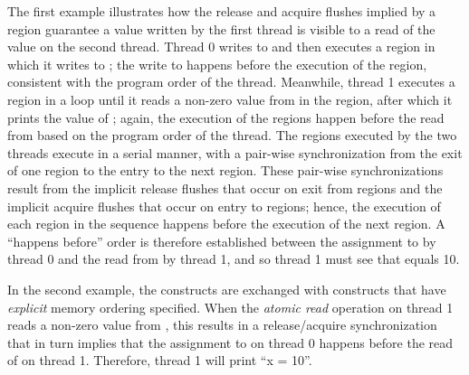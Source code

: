 
The first example illustrates how the release and acquire flushes implied by a
 region guarantee a value written by the first thread is visible
to a read of the value on the second thread. Thread 0 writes to  and
then executes a  region in which it writes to ; the write
to  happens before the execution of the  region,
consistent with the program order of the thread.  Meanwhile, thread 1 executes a
 region in a loop until it reads a non-zero value from
 in the  region, after which it prints the value of
; again, the execution of the  regions happen before the
read from  based on the program order of the thread. The 
regions executed by the two threads execute in a serial manner, with a
pair-wise synchronization from the exit of one  region to the
entry to the next  region.  These pair-wise synchronizations
result from the implicit release flushes that occur on exit from
 regions and the implicit acquire flushes that occur on entry to
 regions; hence, the execution of each  region in
the sequence happens before the execution of the next  region.
A ``happens before'' order is therefore established between the assignment to 
by thread 0 and the read from  by thread 1, and so thread 1 must see that
 equals 10.

{}

In the second example, the  constructs are exchanged with
 constructs that have \emph{explicit} memory ordering specified. When the
\emph{atomic read} operation on thread 1 reads a non-zero value from , this
results in a release/acquire synchronization that in turn implies that the
assignment to  on thread 0 happens before the read of  on thread
1. Therefore, thread 1 will print ``x = 10''.

